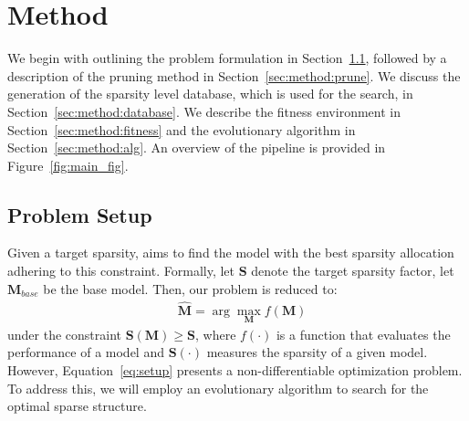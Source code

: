 ﻿%
\vspace{-1em}
\section{Method}

We begin with outlining the problem formulation in Section~\ref{sec:method:setup}, followed by a description of the pruning method in Section~\ref{sec:method:prune}. We discuss the generation of the sparsity level database, which is used for the search, in Section~\ref{sec:method:database}. We describe the fitness environment in Section~\ref{sec:method:fitness} and the evolutionary algorithm in Section~\ref{sec:method:alg}. An overview of the pipeline is provided in Figure~\ref{fig:main_fig}.
\vspace{-1em}
\subsection{Problem Setup}
\label{sec:method:setup}
Given a target sparsity, \sysname aims to find the model with the best sparsity allocation adhering to this constraint. Formally, let $\bm S$ denote the target sparsity factor, let $\bm M_{base}$ be the base model. Then, our problem is reduced to: 
\begin{align}
\label{eq:setup}
    &\hat{\bm M} = \arg \max_{\bm M} f(\bm M)
\end{align}
under the constraint $\bm S(\bm M) \geq \bm S$, where $f(\cdot)$ is a function that evaluates the performance of a model and $\bm S(\cdot)$ measures the sparsity of a given model. However, Equation~\ref{eq:setup} presents a non-differentiable optimization problem. To address this, we will employ an evolutionary algorithm to search for the optimal sparse structure.

\vspace{-1em}
